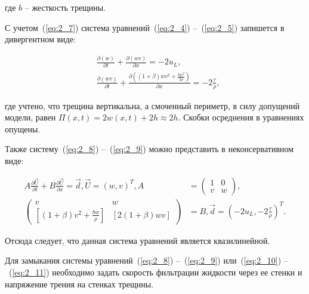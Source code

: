 где $b$ – жесткость трещины.



С учетом~(\ref{eq:2_7}) система уравнений~(\ref{eq:2_4}) –~(\ref{eq:2_5}) запишется в дивергентном виде:

\begin{align}

& \frac{\partial \left(w\right)}{\partial t} + \frac{\partial \left(wv\right)}{\partial x} = - 2 u_L, \label{eq:2_8} \\

& \frac{\partial \left(wv \right)}{\partial t} + \frac{\partial \left(\left(1+\beta\right) wv^2 + \frac{bw^2}{2\rho}  \right)}{\partial x} = -2\frac{\tau}{\rho}, \label{eq:2_9}

\end{align}

где учтено, что трещина вертикальна, а смоченный периметр, в силу допущений модели, равен $\Pi\left(x,t\right) = 2 w\left(x,t\right) + 2h \approx 2h$. Скобки осреднения в уравнениях опущены.



Также систему~(\ref{eq:2_8}) –~(\ref{eq:2_9}) можно представить в неконсервативном виде:

\begin{align}

A \frac{\partial \vec{U}}{\partial t} + B \frac{\partial \vec{U}}{\partial x} = \vec{d},  \vec{U}  = \left(w,v\right)^T ,A &= \left(\begin{matrix}1 & 0 \\ v & w \end{matrix}\right), \label{eq:2_10} \\

\left( \begin{matrix}v & w \\ \left[\left(1+\beta\right) v^2 + \frac{bw}{\rho}\right] & \left[2\left(1+\beta\right)wv\right] \end{matrix}\right) &= B , \vec{d} = \left(-2u_L, -2 \frac{\tau}{\rho}\right)^T.\label{eq:2_11}

\end{align}



Отсюда следует, что данная система уравнений является квазилинейной. 



Для замыкания системы уравнений~(\ref{eq:2_8}) –~(\ref{eq:2_9}) или~(\ref{eq:2_10}) –~(\ref{eq:2_11}) необходимо задать скорость фильтрации жидкости через ее стенки и напряжение трения на стенках трещины.



